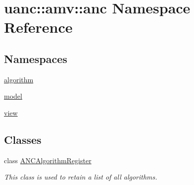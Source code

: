 \hypertarget{namespaceuanc_1_1amv_1_1anc}{}\section{uanc\+:\+:amv\+:\+:anc Namespace Reference}
\label{namespaceuanc_1_1amv_1_1anc}
\subsection*{Namespaces}
\begin{DoxyCompactItemize}
\item 
 \hyperlink{namespaceuanc_1_1amv_1_1anc_1_1algorithm}{algorithm}
\item 
 \hyperlink{namespaceuanc_1_1amv_1_1anc_1_1model}{model}
\item 
 \hyperlink{namespaceuanc_1_1amv_1_1anc_1_1view}{view}
\end{DoxyCompactItemize}
\subsection*{Classes}
\begin{DoxyCompactItemize}
\item 
class \hyperlink{classuanc_1_1amv_1_1anc_1_1_a_n_c_algorithm_register}{A\+N\+C\+Algorithm\+Register}
\begin{DoxyCompactList}\small\item\em This class is used to retain a list of all algorithms. \end{DoxyCompactList}\end{DoxyCompactItemize}
